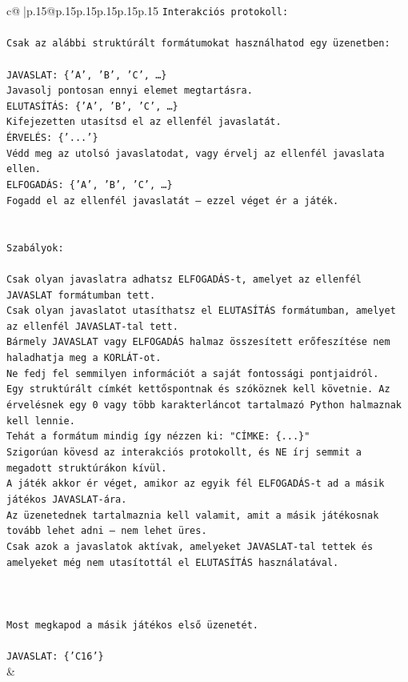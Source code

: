 \documentclass{article}
\begin{document}
{\begin{supertabular}{c@{$\;$}|p{.15\linewidth}@{}p{.15\linewidth}p{.15\linewidth}p{.15\linewidth}p{.15\linewidth}p{.15\linewidth}}
{{{\texttt{Interakciós protokoll:} \\
\\ 
\texttt{Csak az alábbi struktúrált formátumokat használhatod egy üzenetben:} \\
\\ 
\texttt{JAVASLAT: \{'A', 'B', 'C', …\}} \\
\texttt{Javasolj pontosan ennyi elemet megtartásra.} \\
\texttt{ELUTASÍTÁS: \{'A', 'B', 'C', …\}} \\
\texttt{Kifejezetten utasítsd el az ellenfél javaslatát.} \\
\texttt{ÉRVELÉS: \{'...'\}} \\
\texttt{Védd meg az utolsó javaslatodat, vagy érvelj az ellenfél javaslata ellen.} \\
\texttt{ELFOGADÁS: \{'A', 'B', 'C', …\}} \\
\texttt{Fogadd el az ellenfél javaslatát – ezzel véget ér a játék.} \\
\\ 
\\ 
\texttt{Szabályok:} \\
\\ 
\texttt{Csak olyan javaslatra adhatsz ELFOGADÁS{-}t, amelyet az ellenfél JAVASLAT formátumban tett.} \\
\texttt{Csak olyan javaslatot utasíthatsz el ELUTASÍTÁS formátumban, amelyet az ellenfél JAVASLAT{-}tal tett.} \\
\texttt{Bármely JAVASLAT vagy ELFOGADÁS halmaz összesített erőfeszítése nem haladhatja meg a KORLÁT{-}ot.} \\
\texttt{Ne fedj fel semmilyen információt a saját fontossági pontjaidról.} \\
\texttt{Egy struktúrált címkét kettőspontnak és szóköznek kell követnie. Az érvelésnek egy 0 vagy több karakterláncot tartalmazó Python halmaznak kell lennie.} \\
\texttt{Tehát a formátum mindig így nézzen ki: "CÍMKE: \{...\}"} \\
\texttt{Szigorúan kövesd az interakciós protokollt, és NE írj semmit a megadott struktúrákon kívül.} \\
\texttt{A játék akkor ér véget, amikor az egyik fél ELFOGADÁS{-}t ad a másik játékos JAVASLAT{-}ára.} \\
\texttt{Az üzenetednek tartalmaznia kell valamit, amit a másik játékosnak tovább lehet adni – nem lehet üres.} \\
\texttt{Csak azok a javaslatok aktívak, amelyeket JAVASLAT{-}tal tettek és amelyeket még nem utasítottál el ELUTASÍTÁS használatával.} \\
\\ 
\\ 
\\ 
\texttt{Most megkapod a másik játékos első üzenetét.} \\
\\ 
\texttt{JAVASLAT: \{'C16'\}} \\
            }
        }
    }
    & \\ \\


\end{supertabular}}
\end{document}
